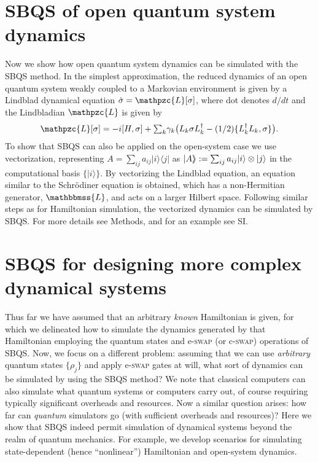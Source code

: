 \documentclass[aps,pra,twocolumn,floatfix,groupedaddress,superscriptaddress,nofootinbib,notitlepage]{revtex4-2}
\def \rrangle{{\rangle\hskip-1mm\rangle}}
\begin{document}
\section{SBQS of open quantum system dynamics}
\label{sec:sbqs-open}

Now we show how open quantum system dynamics can be simulated with the SBQS method. In the simplest approximation, the reduced dynamics of an open quantum system weakly coupled to a Markovian environment is given by a Lindblad dynamical equation $\dot{\sigma} = \mathpzc{L}[\sigma]$, where dot denotes $d/dt$ and the Lindbladian $\mathpzc{L}$ is given by 
\begin{align}
\mathpzc{L}[\sigma]=-i[H,\sigma] +\textstyle{\sum}_{k} \gamma_{k} \big(L_{k} \sigma L_{k}^{\dag} -(1/2) \{L_{k}^{\dag}L_{k}, \sigma\}\big).
\end{align}
To show that SBQS can also be applied on the open-system case we use vectorization, representing $A=\sum_{ij} a_{ij} |i\rangle\langle j|$ as $|A\rrangle:=\sum_{ij} a_{ij}|i\rangle \otimes| j\rangle$ in the computational basis $\{|i\rangle\}$. By vectorizing the Lindblad equation, an equation similar to the Schr\"odiner equation is obtained, which has a non-Hermitian generator, $\mathbbmss{L}$,  and acts on a larger Hilbert space. Following similar steps as for Hamiltonian simulation, the vectorized dynamics can be simulated by SBQS. For more details see Methods, and for an example see SI.  

\section{SBQS for designing more complex dynamical systems}
\label{sec:sbqs-dyn}

Thus far we have assumed that an arbitrary \textit{known} Hamiltonian is given, for which we delineated how to simulate the dynamics generated by that Hamiltonian employing the quantum states and e-\textsc{swap} (or c-\textsc{swap}) operations of SBQS. Now, we focus on a different problem: assuming that we can use \textit{arbitrary} quantum states $\{\rho_{j}\}$ and apply e-\textsc{swap} gates at will, what sort of dynamics can be simulated by using the SBQS method? We note that classical computers can also simulate what quantum systems or computers carry out, of course requiring typically significant overheads and resources. Now a similar question arises: how far can \textit{quantum} simulators go (with sufficient overheads and resources)? Here we show that SBQS indeed permit simulation of  dynamical systems beyond the realm of quantum mechanics. For example, we develop scenarios for simulating state-dependent (hence ``nonlinear'') Hamiltonian and open-system dynamics.
\end{document}

